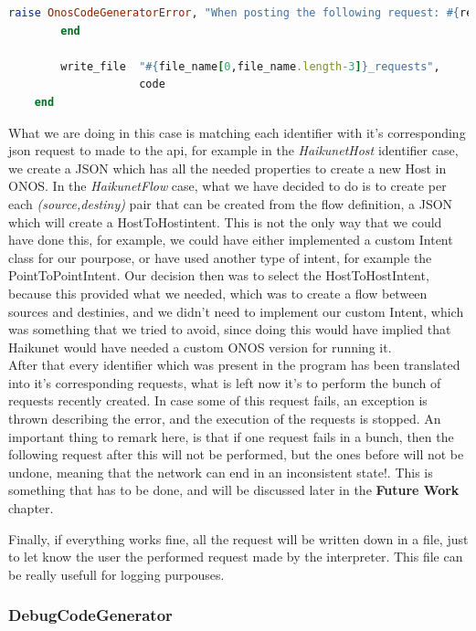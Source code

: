 \begin{lstlisting}[language=Ruby,breaklines=true]
          raise OnosCodeGeneratorError, "When posting the following request: #{request['message']} to the endpoint #{request['end_point']}, the following error was raised #{response.body}" unless response.success?
        end

        write_file  "#{file_name[0,file_name.length-3]}_requests",
                    code
    end
\end{lstlisting}

What we are doing in this case is matching each identifier with it's corresponding json request to made to the api, for example in the \textit{HaikunetHost} identifier case, we create a JSON which has all the needed properties to create a new Host in ONOS. In the \textit{HaikunetFlow} case, what we have decided to do is to create per each \textit{(source,destiny)} pair that can be created from the flow definition, a JSON which will create a HostToHostintent. This is not the only way that we could have done this, for example, we could have either implemented a custom Intent class for our pourpose, or have used another type of intent, for example the PointToPointIntent. Our decision then was to select the HostToHostIntent, because this provided what we needed, which was to create a flow between sources and destinies, and we didn't need to implement our custom Intent, which was something that we tried to avoid, since doing this would have implied that Haikunet would have needed a custom ONOS version for running it.\\
After that every identifier which was present in the program has been translated into it's corresponding requests, what is left now it's to perform the bunch of requests recently created. In case some of this request fails, an exception is thrown describing the error, and the execution of the requests is stopped. An important thing to remark here, is that if one request fails in a bunch, then the following request after this will not be performed, but the ones before will not be undone, meaning that the network can end in an inconsistent state!. This is something that has to be done, and will be discussed later in the \textbf{Future Work} chapter.

Finally, if everything works fine, all the request will be written down in a file, just to let know the user the performed request made by the interpreter. This file can be really usefull for logging purpouses.

\subsubsection{DebugCodeGenerator}

